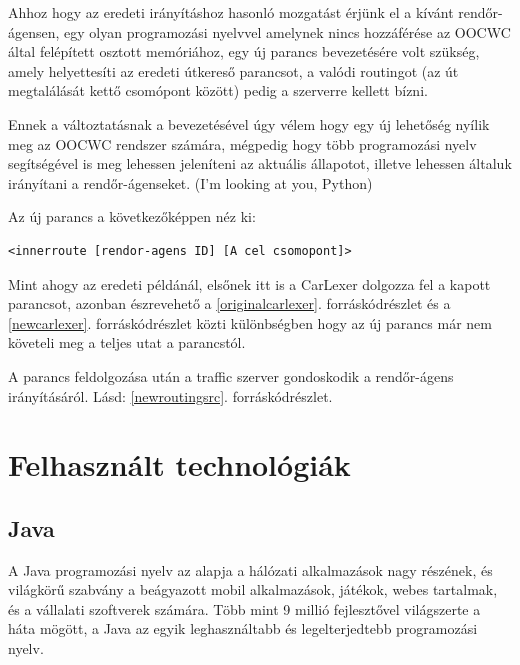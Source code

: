 \documentclass[a4paper,12pt]{report}
\begin{document}
Ahhoz hogy az eredeti irányításhoz hasonló mozgatást érjünk el a kívánt rendőr-ágensen, egy olyan programozási nyelvvel amelynek nincs hozzáférése az OOCWC által felépített osztott memóriához, egy új parancs bevezetésére volt szükség, amely helyettesíti az eredeti útkereső parancsot, a valódi routingot (az út megtalálását kettő csomópont között) pedig a szerverre kellett bízni.

\vspace{2mm}
Ennek a változtatásnak a bevezetésével úgy vélem hogy egy új lehetőség nyílik meg az OOCWC rendszer számára, mégpedig hogy több programozási nyelv segítségével is meg lehessen jeleníteni az aktuális állapotot, illetve lehessen általuk irányítani a rendőr-ágenseket. (I'm looking at you, Python)

\vspace{2mm}
Az új parancs a következőképpen néz ki:
\begin{lstlisting}
<innerroute [rendor-agens ID] [A cel csomopont]>
\end{lstlisting}

\vspace{2mm}
Mint ahogy az eredeti példánál, elsőnek itt is a CarLexer dolgozza fel a kapott parancsot, azonban észrevehető a \ref{originalcarlexer}. forráskódrészlet és a \ref{newcarlexer}. forráskódrészlet közti különbségben hogy az új parancs már nem követeli meg a teljes utat a parancstól.



\vspace{2mm}
A parancs feldolgozása után a traffic szerver gondoskodik a rendőr-ágens irányításáról. Lásd: \ref{newroutingsrc}. forráskódrészlet.



\newpage
\chapter{Felhasznált technológiák}
\label{technologies}

\section{Java}
\label{java}

A Java programozási nyelv az alapja a hálózati alkalmazások nagy részének, és világkörű szabvány a beágyazott mobil alkalmazások, játékok, webes tartalmak, és a vállalati szoftverek számára. Több mint 9 millió fejlesztővel világszerte a háta mögött, a Java az egyik leghasználtabb és legelterjedtebb programozási nyelv. 
\end{document}
